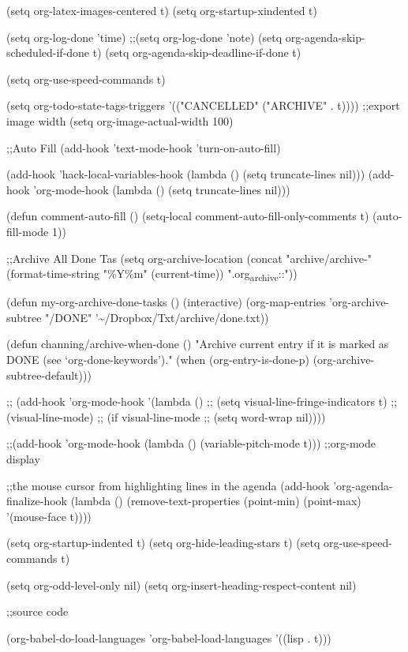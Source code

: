\documentclass[presentation]{beamer}
\begin{document}
(setq org-latex-images-centered t)
(setq org-startup-xindented t)

(setq org-log-done 'time)
;;(setq org-log-done 'note)
(setq org-agenda-skip-scheduled-if-done t)
(setq org-agenda-skip-deadline-if-done t)

(setq org-use-speed-commands t)

(setq org-todo-state-tags-triggers
      '(("CANCELLED" ("ARCHIVE" . t))))
;;export image width
(setq org-image-actual-width 100)

;;Auto Fill
(add-hook 'text-mode-hook 'turn-on-auto-fill)

(add-hook 'hack-local-variables-hook (lambda () (setq
                                                 truncate-lines nil)))
(add-hook 'org-mode-hook
          (lambda () (setq truncate-lines nil)))

(defun comment-auto-fill ()
  (setq-local comment-auto-fill-only-comments t)
  (auto-fill-mode 1))

;;Archive All Done Tas
(setq org-archive-location (concat "archive/archive-" (format-time-string "\%Y\%m" (current-time)) ".org\textsubscript{archive}::"))

(defun my-org-archive-done-tasks ()
  (interactive)
  (org-map-entries 'org-archive-subtree "/DONE" '\textasciitilde{}/Dropbox/Txt/archive/done.txt))

(defun channing/archive-when-done ()
  "Archive current entry if it is marked as DONE (see `org-done-keywords')."
  (when (org-entry-is-done-p)
    (org-archive-subtree-default)))

;; (add-hook 'org-mode-hook '(lambda ()
;; (setq visual-line-fringe-indicators t)
;; (visual-line-mode)
;; (if visual-line-mode
;; (setq word-wrap nil))))

;;(add-hook 'org-mode-hook (lambda () (variable-pitch-mode t)))
;;org-mode display

;;the mouse cursor from highlighting lines in the agenda
(add-hook 'org-agenda-finalize-hook
          (lambda () (remove-text-properties
                      (point-min) (point-max) '(mouse-face t))))

(setq org-startup-indented t)
(setq org-hide-leading-stars t)
(setq org-use-speed-commands t)

(setq org-odd-level-only nil)
(setq org-insert-heading-respect-content nil)


;;source code

(org-babel-do-load-languages
 'org-babel-load-languages
 '((lisp . t)))
\end{document}
